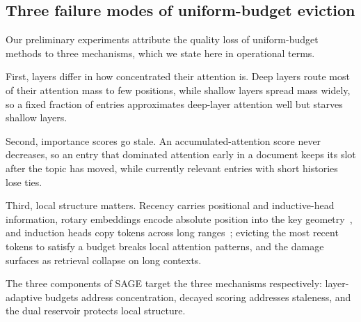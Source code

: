 \subsection{Three failure modes of uniform-budget eviction}

Our preliminary experiments attribute the quality loss of
uniform-budget methods to three mechanisms, which we state here in
operational terms.

First, layers differ in how concentrated their attention is. Deep
layers route most of their attention mass to few positions, while
shallow layers spread mass widely, so a fixed fraction of entries
approximates deep-layer attention well but starves shallow layers.

Second, importance scores go stale. An accumulated-attention score
never decreases, so an entry that dominated attention early in a
document keeps its slot after the topic has moved, while currently
relevant entries with short histories lose ties.

Third, local structure matters. Recency carries positional and
inductive-head information, rotary embeddings encode absolute
position into the key geometry~\cite{su2021roformer}, and induction
heads copy tokens across long ranges~\cite{su2024zoology}; evicting
the most recent tokens to satisfy a budget breaks local attention
patterns, and the damage surfaces as retrieval collapse on long
contexts.

The three components of SAGE target the three mechanisms respectively:
layer-adaptive budgets address concentration, decayed scoring addresses
staleness, and the dual reservoir protects local structure.

